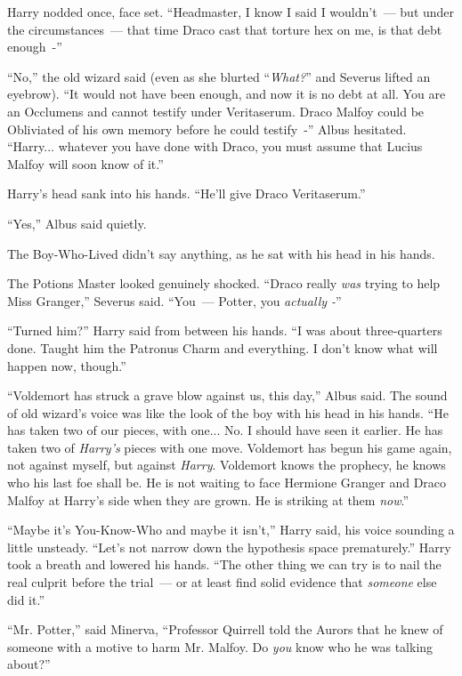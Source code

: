 Harry nodded once, face set. ``Headmaster, I know I said I wouldn't~--- but under the circumstances~--- that time Draco cast that torture hex on me, is that debt enough~-''

``No,'' the old wizard said (even as she blurted ``\emph{What?}'' and Severus lifted an eyebrow). ``It would not have been enough, and now it is no debt at all. You are an Occlumens and cannot testify under Veritaserum. Draco Malfoy could be Obliviated of his own memory before he could testify~-'' Albus hesitated. ``Harry... whatever you have done with Draco, you must assume that Lucius Malfoy will soon know of it.''

Harry's head sank into his hands. ``He'll give Draco Veritaserum.''

``Yes,'' Albus said quietly.

The Boy-Who-Lived didn't say anything, as he sat with his head in his hands.

The Potions Master looked genuinely shocked. ``Draco really \emph{was} trying to help Miss Granger,'' Severus said. ``You~--- Potter, you \emph{actually -}''

``Turned him?'' Harry said from between his hands. ``I was about three-quarters done. Taught him the Patronus Charm and everything. I don't know what will happen now, though.''

``Voldemort has struck a grave blow against us, this day,'' Albus said. The sound of old wizard's voice was like the look of the boy with his head in his hands. ``He has taken two of our pieces, with one... No. I should have seen it earlier. He has taken two of \emph{Harry's} pieces with one move. Voldemort has begun his game again, not against myself, but against \emph{Harry}. Voldemort knows the prophecy, he knows who his last foe shall be. He is not waiting to face Hermione Granger and Draco Malfoy at Harry's side when they are grown. He is striking at them \emph{now}.''

``Maybe it's You-Know-Who and maybe it isn't,'' Harry said, his voice sounding a little unsteady. ``Let's not narrow down the hypothesis space prematurely.'' Harry took a breath and lowered his hands. ``The other thing we can try is to nail the real culprit before the trial~--- or at least find solid evidence that \emph{someone} else did it.''

``Mr. Potter,'' said Minerva, ``Professor Quirrell told the Aurors that he knew of someone with a motive to harm Mr. Malfoy. Do \emph{you} know who he was talking about?''

